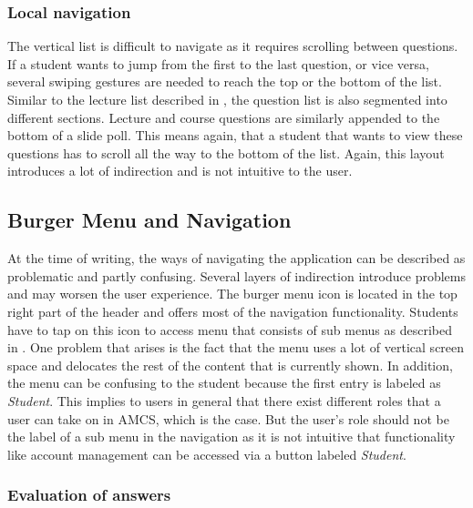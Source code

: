 \subsubsection{Local navigation}

The vertical list is difficult to navigate as it requires scrolling between questions. If a student wants to jump from the first to the last question,  or vice versa, several swiping gestures are needed to reach the top or the bottom of the list.
Similar to the lecture list described in \todosct, the question list is also segmented into different sections. Lecture and course questions are similarly appended to the bottom of a slide poll. This means again, that a student that wants to view these questions has to scroll all the way to the bottom of the list. Again, this layout introduces a lot of indirection and is not intuitive to the user.


\subsection{Burger Menu and Navigation}

At the time of writing, the ways of navigating the application can be described as problematic and partly confusing. Several layers of indirection introduce problems and may worsen the user experience.
The burger menu icon is located in the top right part of the header and offers most of the navigation functionality. Students have to tap on this icon to access menu that consists of sub menus as described in \todosct. 
One problem that arises is the fact that the menu uses a lot of vertical screen space and delocates the rest of the content that is currently shown.
In addition, the menu can be confusing to the student because the first entry is labeled as \emph{Student}. This implies to users in general that there exist different roles that a user can take on in AMCS, which is the case. But the user's role should not be the label of a sub menu in the navigation as it is not intuitive that functionality like account management can be accessed via a button labeled \emph{Student}.

\subsubsection{Evaluation of answers}


